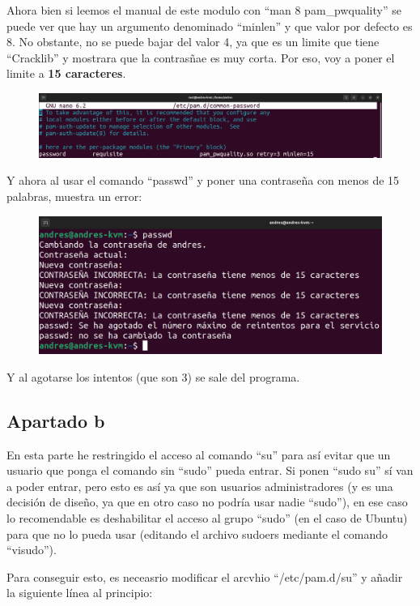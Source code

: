 \documentclass{article}
\begin{document}
Ahora bien si leemos el manual de este modulo con ``man 8 pam\_pwquality'' se puede ver que hay un argumento denominado ``minlen'' y que valor por defecto es 8. No obstante, no se puede bajar del valor 4, ya que es un limite que tiene ``Cracklib'' y mostrara que la contrasñae es muy corta. Por eso, voy a poner el limite a \textbf{15 caracteres}.

\begin{figure}[H]
    \includegraphics[width=\textwidth]{imagenes/passwordminlen15.png}
\end{figure}

Y ahora al usar el comando ``passwd'' y poner una contraseña con menos de 15 palabras, muestra un error:

\begin{figure}[H]
    \includegraphics[width=\textwidth]{imagenes/passwordminlen15passwd.png}
\end{figure}

Y al agotarse los intentos (que son 3) se sale del programa.
\subsection{Apartado b}
En esta parte he restringido el acceso al comando ``su'' para así evitar que un usuario que ponga el comando sin ``sudo'' pueda entrar. Si ponen ``sudo su'' sí van a poder entrar, pero esto es así ya que son usuarios administradores (y es una decisión de diseño, ya que en otro caso no podría usar nadie ``sudo''), en ese caso lo recomendable es deshabilitar el acceso al grupo ``sudo'' (en el caso de Ubuntu) para que no lo pueda usar (editando el archivo sudoers mediante el comando ``visudo'').

Para conseguir esto, es neceasrio modificar el arcvhio ``/etc/pam.d/su'' y añadir la siguiente línea al principio:
\end{document}
